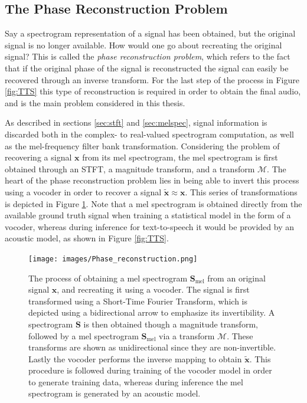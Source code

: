 \documentclass{report}
\begin{document}
\subsection{The Phase Reconstruction Problem} \label{sec:phaseprob}

Say a spectrogram representation of a signal has been obtained, but the original signal is no longer available. How would one go about recreating the original signal? This is called the \textit{phase reconstruction problem}, which refers to the fact that if the original phase of the signal is reconstructed the signal can easily be recovered through an inverse transform. For the last step of the process in Figure \ref{fig:TTS} this type of reconstruction is required in order to obtain the final audio, and is the main problem considered in this thesis.

As described in sections \ref{sec:stft} and \ref{sec:melspec}, signal information is discarded both in the complex- to real-valued spectrogram computation, as well as the mel-frequency filter bank transformation. Considering the problem of recovering a signal $\bm{x}$ from its mel spectrogram, the mel spectrogram is first obtained through an STFT, a magnitude transform, and a transform $\mathcal{M}$. The heart of the phase reconstruction problem lies in being able to invert this process using a vocoder in order to recover a signal $\tilde{\bm{x}} \approx \bm{x}$. This series of transformations is depicted in Figure \ref{fig:phasere}. Note that a mel spectrogram is obtained directly from the available ground truth signal when training a statistical model in the form of a vocoder, whereas during inference for text-to-speech it would be provided by an acoustic model, as shown in Figure \ref{fig:TTS}.

\begin{figure}[H]
    \centering
    \texttt{[image: images/Phase\_reconstruction.png]}
    \caption{\onehalfspacing The process of obtaining a mel spectrogram $\bm{S}_{\text{mel}}$ from an original signal $\bm{x}$, and recreating it using a vocoder. The signal is first transformed using a Short-Time Fourier Transform, which is depicted using a bidirectional arrow to emphasize its invertibility. A spectrogram $\bm{S}$ is then obtained though a magnitude transform, followed by a mel spectrogram $\bm{S}_{\text{mel}}$ via a transform $\mathcal{M}$. These transforms are shown as unidirectional since they are non-invertible. Lastly the vocoder performs the inverse mapping to obtain $\tilde{\bm{x}}$. This procedure is followed during training of the vocoder model in order to generate training data, whereas during inference the mel spectrogram is generated by an acoustic model.}
    \label{fig:phasere}
\end{figure}
\end{document}
